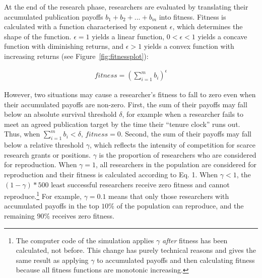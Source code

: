 \documentclass[british,,man,mask,floatsintext]{apa6}
\begin{document}
At the end of the research phase, researchers are evaluated by translating their accumulated publication payoffs \(b_1 + b_2 + ... + b_m\) into fitness.
Fitness is calculated with a function characterised by exponent \(\epsilon\), which determines the shape of the function. \(\epsilon = 1\) yields a linear function, \(0 < \epsilon < 1\) yields a concave function with diminishing returns, and \(\epsilon > 1\) yields a convex function with increasing returns (see Figure~\ref{fig:fitnessplot}):

\begin{align}
fitness = (\sum_{i=1}^{m} b_i)^\epsilon
\end{align}

However, two situations may cause a researcher's fitness to fall to zero even when their accumulated payoffs are non-zero.
First, the sum of their payoffs may fall below an absolute survival threshold \(\delta\), for example when a researcher fails to meet an agreed publication target by the time their \enquote{tenure clock} runs out.
Thus, when \(\sum_{i=1}^{m} b_i < \delta\), \(fitness = 0\).
Second, the sum of their payoffs may fall below a relative threshold \(\gamma\), which reflects the intensity of competition for scarce research grants or positions.
\(\gamma\) is the proportion of researchers who are considered for reproduction.
When \(\gamma = 1\), all researchers in the population are considered for reproduction and their fitness is calculated according to Eq. 1.
When \(\gamma < 1\), the \((1 - \gamma)*500\) least successful researchers receive zero fitness and cannot reproduce.\footnote{The computer code of the simulation applies \(\gamma\) \emph{after} fitness has been calculated, not before. This change has purely technical reasons and gives the same result as applying \(\gamma\) to accumulated payoffs and then calculating fitness because all fitness functions are monotonic increasing.}
For example, \(\gamma = 0.1\) means that only those researchers with accumulated payoffs in the top \(10\%\) of the population can reproduce, and the remaining \(90\%\) receives zero fitness.
\end{document}
